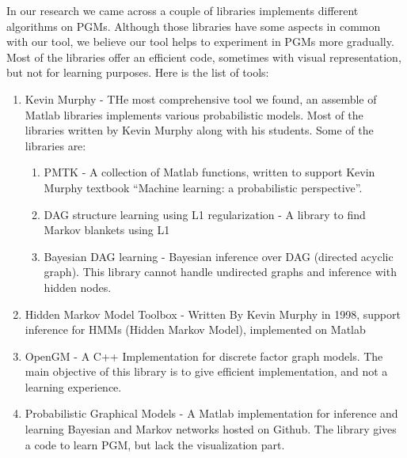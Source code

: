 \documentclass{article}
\begin{document}
    In our research we came across a couple of libraries implements different algorithms on PGMs. Although those libraries have some aspects in common with our tool, we believe our tool helps to experiment in PGMs more gradually. Most of the libraries offer an efficient code, sometimes with visual representation, but not for learning purposes. Here is the list of tools:
    \begin{enumerate}
        \item Kevin Murphy - THe most comprehensive tool we found, an assemble of Matlab libraries implements various probabilistic models. Most of the libraries written by Kevin Murphy along with his students. Some of the libraries are:
            \begin{enumerate}
                \item PMTK - A collection of Matlab functions, written to support Kevin Murphy textbook ``Machine learning: a probabilistic perspective''.
                \item DAG structure learning using L1 regularization - A library to find Markov blankets using L1
                \item Bayesian DAG learning - Bayesian inference over DAG (directed acyclic graph). This library cannot handle undirected graphs and inference with hidden nodes.
            \end{enumerate}
        \item Hidden Markov Model Toolbox - Written By Kevin Murphy in 1998, support inference for HMMs (Hidden Markov Model), implemented on Matlab
        \item OpenGM - A C++ Implementation for discrete factor graph models. The main objective of this library is to give efficient implementation, and not a learning experience.
        \item Probabilistic Graphical Models - A Matlab implementation for inference and learning Bayesian and Markov networks hosted on Github. The library gives a code to learn PGM, but lack the visualization part.
    \end{enumerate}

    \pagebreak
\end{document}
